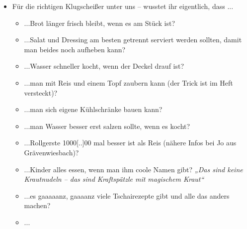 \begin{itemize}
    \item Für die richtigen Klugscheißer unter uns – wusstet ihr eigentlich, dass ...
    \begin{itemize}
        \item ...Brot länger frisch bleibt, wenn es am Stück ist?
        \item ...Salat und Dressing am besten getrennt serviert werden sollten, damit man beides noch aufheben kann?
        \item ...Wasser schneller kocht, wenn der Deckel drauf ist?
        \item ...man mit Reis und einem Topf zaubern kann (der Trick ist im Heft versteckt)?
        \item ...man sich eigene Kühlschränke bauen kann?
        \item ...man Wasser besser erst salzen sollte, wenn es kocht?
        \item ...Rollgerste 1000[..]00 mal besser ist als Reis (nähere Infos bei Jo aus Grävenwiesbach)?
        \item ...Kinder alles essen, wenn man ihm coole Namen gibt? \emph{„Das sind keine Krautnudeln – das sind Kraftspätzle mit magischem Kraut“}
        \item ...es gaaaaanz, gaaaanz viele Tschairezepte gibt und alle das anders machen?
        \item ...
    \end{itemize}
\end{itemize}